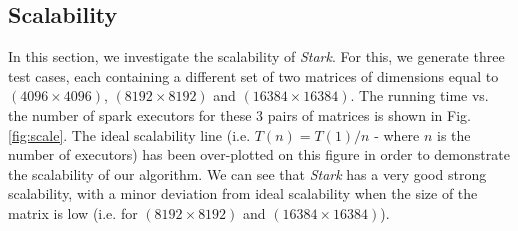\subsection{Scalability}
In this section, we investigate the scalability of \textit{Stark}. For this, we generate three test cases, each containing a different set of two matrices of dimensions equal to $(4096\times 4096)$, $(8192\times 8192)$ and $(16384\times 16384)$. The running time vs. the number of spark executors for these $3$ pairs of matrices is shown in Fig. \ref{fig:scale}. The ideal scalability line (i.e. $T(n) = T(1)/n$ - where $n$ is the number of executors) has been over-plotted on this figure in order to demonstrate the scalability of our algorithm. We can see that \textit{Stark} has a very good strong scalability, with a minor deviation from ideal scalability when the size of the matrix is low (i.e. for $(8192\times 8192)$ and $(16384\times 16384)$).  

